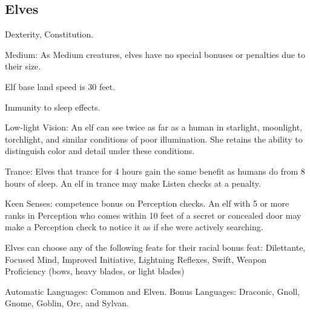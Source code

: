\subsection{Elves}
\begin{itemize*}
\item {} Dexterity,  Constitution.
\item Medium: As Medium creatures, elves have no special bonuses or penalties due to their size.
\item Elf base land speed is 30 feet.
\item Immunity to sleep effects.
\item Low-light Vision: An elf can see twice as far as a human in starlight, moonlight, torchlight, and similar conditions of poor illumination. She retains the ability to distinguish color and detail under these conditions.
 \item Trance: Elves that trance for 4 hours gain the same benefit as humans do from 8 hours of sleep. An elf in trance may make Listen checks at a  penalty.
\item Keen Senses:  competence bonus on Perception checks. An elf with 5 or more ranks in Perception who comes within 10 feet of a secret or concealed door may make a Perception check to notice it as if she were actively searching. 
\item Elves can choose any of the following feats for their racial bonus feat: Dilettante, Focused Mind, Improved Initiative, Lightning Reflexes, Swift, Weapon Proficiency (bows, heavy blades, or light blades)
\item Automatic Languages: Common and Elven. Bonus Languages: Draconic, Gnoll, Gnome, Goblin, Orc, and Sylvan.
\end{itemize*}

